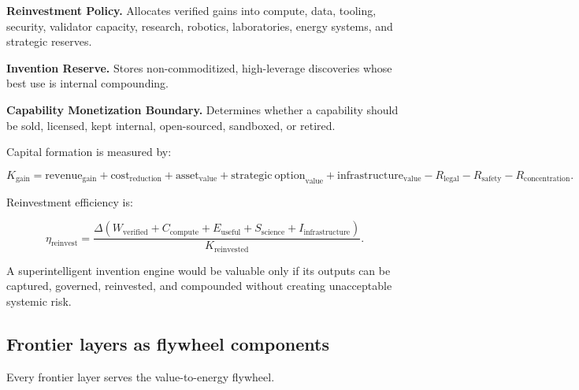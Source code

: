 \documentclass[11pt]{article}
\begin{document}
\textbf{Reinvestment Policy.} Allocates verified gains into compute, data, tooling, security, validator capacity, research, robotics, laboratories, energy systems, and strategic reserves.

\textbf{Invention Reserve.} Stores non-commoditized, high-leverage discoveries whose best use is internal compounding.

\textbf{Capability Monetization Boundary.} Determines whether a capability should be sold, licensed, kept internal, open-sourced, sandboxed, or retired.

Capital formation is measured by:

\[
K_{\mathrm{gain}}
=
\mathrm{revenue}_{\mathrm{gain}}
+
\mathrm{cost}_{\mathrm{reduction}}
+
\mathrm{asset}_{\mathrm{value}}
+
\mathrm{strategic\ option}_{\mathrm{value}}
+
\mathrm{infrastructure}_{\mathrm{value}}
-
R_{\mathrm{legal}}
-
R_{\mathrm{safety}}
-
R_{\mathrm{concentration}}.
\]

Reinvestment efficiency is:

\[
\eta_{\mathrm{reinvest}}
=
\frac{\Delta(W_{\mathrm{verified}}+C_{\mathrm{compute}}+E_{\mathrm{useful}}+S_{\mathrm{science}}+I_{\mathrm{infrastructure}})}{K_{\mathrm{reinvested}}}.
\]

A superintelligent invention engine would be valuable only if its outputs can be captured, governed, reinvested, and compounded without creating unacceptable systemic risk.

\subsection{Frontier layers as flywheel components}\label{frontier-layers-as-flywheel-components}

Every frontier layer serves the value-to-energy flywheel.
\end{document}
